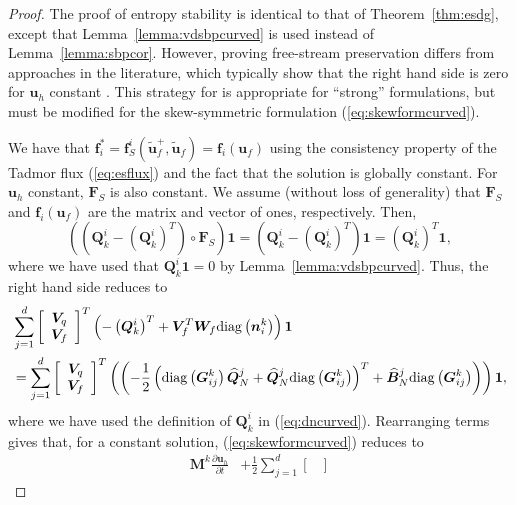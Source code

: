 \documentclass{svjour3}                     %
\renewcommand{\hat}{\widehat}
\renewcommand{\tilde}{\widetilde}
\newcommand{\diag}[1]{{\rm diag}\LRp{#1}}
\newcommand{\pd}[2]{\frac{\partial#1}{\partial#2}}
\newcommand{\LRp}[1]{\left( #1 \right)}
\newcommand{\LRs}[1]{\left[ #1 \right]}
\begin{document}
\begin{proof}
The proof of entropy stability is identical to that of Theorem~\ref{thm:esdg}, except that Lemma~\ref{lemma:vdsbpcurved} is used instead of Lemma~\ref{lemma:sbpcor}.  However, proving free-stream preservation differs from approaches in the literature, which typically show that the right hand side is zero for $\bm{u}_h$ constant \cite{crean2018entropy, chan2018discretely}.  This strategy for is appropriate for ``strong'' formulations, but must be modified for the skew-symmetric formulation (\ref{eq:skewformcurved}).  

We have that $\bm{f}_i^* = \bm{f}^i_S(\tilde{\bm{u}}_f^+,\tilde{\bm{u}}_f) = \bm{f}_i(\bm{u}_f)$ using the consistency property of the Tadmor flux (\ref{eq:esflux}) and the fact that the solution is globally constant.  For $\bm{u}_h$ constant, $\bm{F}_S$ is also constant.  We assume (without loss of generality) that $\bm{F}_S$ and $\bm{f}_i(\bm{u}_f)$ are the matrix and vector of ones, respectively.  Then, 
\[
\LRp{\LRp{\bm{Q}^i_k - \LRp{\bm{Q}^i_k}^T} \circ \bm{F}_S}\bm{1} = \LRp{\bm{Q}^i_k - \LRp{\bm{Q}^i_k}^T}\bm{1} = \LRp{\bm{Q}^i_k}^T\bm{1},
\]
where we have used that $\bm{Q}^i_k\bm{1} = 0$ by Lemma~\ref{lemma:vdsbpcurved}.  Thus, the right hand side reduces to 
\begin{align*}
&\sum_{j=1}^d \LRs{\begin{array}{cc}
\bm{V}_q \\
\bm{V}_f\end{array}}^T \LRp{-\LRp{\bm{Q}^i_k}^T + \bm{V}_f^T \bm{W}_f \diag{{\bm{n}^k_i}}}\bm{1}\\
&= \sum_{j=1}^d \LRs{\begin{array}{cc}
\bm{V}_q \\
\bm{V}_f\end{array}}^T \LRp{\LRp{ -\frac{1}{2}\LRp{\diag{\bm{G}^k_{ij}}\hat{\bm{Q}}^j_N + \hat{\bm{Q}}^j_N\diag{\bm{G}^k_{ij}}}^T + \hat{\bm{B}}^j_N \diag{\bm{G}^k_{ij}}}}\bm{1},
\end{align*}
where we have used the definition of $\bm{Q}^i_k$ in (\ref{eq:dncurved}).  Rearranging terms gives that, for a constant solution, (\ref{eq:skewformcurved}) reduces to
\begin{align*}
\bm{M}^k\pd{\bm{u}_h}{t} &+ \frac{1}{2} \sum_{j=1}^d \LRs{\begin{array}{cc}

\end{array}}
\end{align*}
\end{proof}
\end{document}

